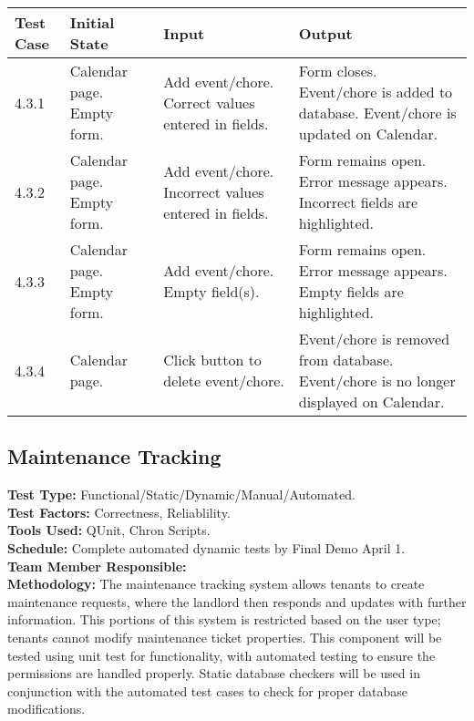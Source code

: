 \documentclass[12pt]{article}
\begin{document}
\begin{longtable}{|p{2cm}|p{3cm}|p{5cm}|p{5cm}|}
\hline
\textbf{Test Case}  & \textbf{Initial State} & \textbf{Input} & \textbf{Output} \\ \hline
4.3.1 & Calendar page. Empty form. & Add event/chore. Correct values entered in fields. & Form closes. Event/chore is added to database. Event/chore is updated on Calendar. \\ 
\hline
4.3.2 & Calendar page. Empty form. & Add event/chore. Incorrect values entered in fields. & Form remains open. Error message appears. Incorrect fields are highlighted. \\
\hline
4.3.3 & Calendar page. Empty form. & Add event/chore. Empty field(s). & Form remains open. Error message appears. Empty fields are highlighted. \\
\hline
4.3.4 & Calendar page. & Click button to delete event/chore.  & Event/chore is removed from database. Event/chore is no longer displayed on Calendar. \\
\hline
\end{longtable}

\subsection{Maintenance Tracking}
\textbf{Test Type:} Functional/Static/Dynamic/Manual/Automated. \\
\textbf{Test Factors:} Correctness, Reliablility. \\
\textbf{Tools Used:} QUnit, Chron Scripts. \\
\textbf{Schedule:} Complete automated dynamic tests by Final Demo April 1. \\
\textbf{Team Member Responsible:} \\
\textbf{Methodology:} The maintenance tracking system allows tenants to create maintenance requests, where the landlord then responds and updates with further information. This portions of this system is restricted based on the user type; tenants cannot modify maintenance ticket properties. This component will be tested using unit test for functionality, with automated testing to ensure the permissions are handled properly. Static database checkers will be used in conjunction with the automated test cases to check for proper database modifications.
\end{document}
